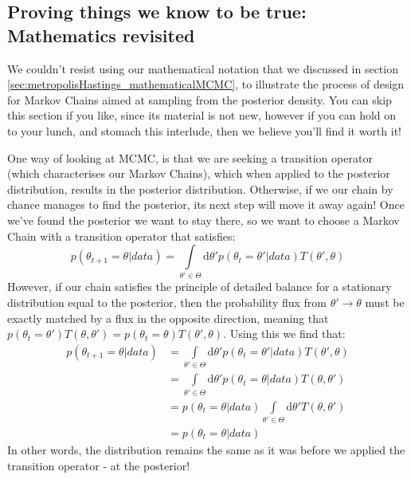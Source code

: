 \documentclass[11pt,fullpage]{book}
\begin{document}
\subsection{Proving things we know to be true: Mathematics revisited}
We couldn't resist using our mathematical notation that we discussed in section \ref{sec:metropolisHastings_mathematicalMCMC}, to illustrate the process of design for Markov Chains aimed at sampling from the posterior density. You can skip this section if you like, since its material is not new, however if you can hold on to your lunch, and stomach this interlude, then we believe you'll find it worth it!

One way of looking at MCMC, is that we are seeking a transition operator (which characterises our Markov Chains), which when applied to the posterior distribution, results in the posterior distribution\cite{chib1995understanding}. Otherwise, if we our chain by chance manages to find the posterior, its next step will move it away again! Once we've found the posterior we want to stay there, so we want to choose a Markov Chain with a transition operator that satisfies:
%
\begin{equation}
p(\theta_{t+1}=\theta|data)= \int\limits_{\theta'\in\Theta} \mathrm{d}\theta' p(\theta_t=\theta'|data) T(\theta',\theta)
\end{equation} 
%
However, if our chain satisfies the principle of detailed balance for a stationary distribution equal to the posterior, then the probability flux from $\theta'\rightarrow\theta$ must be exactly matched by a flux in the opposite direction, meaning that $p(\theta_t=\theta') T(\theta,\theta') = p(\theta_t=\theta) T(\theta',\theta)$. Using this we find that:
%
\begin{equation}
\begin{align}
p(\theta_{t+1}=\theta|data) &= \int\limits_{\theta'\in\Theta} \mathrm{d}\theta' p(\theta_t=\theta'|data) T(\theta',\theta)\\
&=\int\limits_{\theta'\in\Theta} \mathrm{d}\theta' p(\theta_t=\theta|data) T(\theta,\theta')\\
&=p(\theta_t=\theta|data) \int\limits_{\theta'\in\Theta} \mathrm{d}\theta' T(\theta,\theta')\\
&= p(\theta_t=\theta|data)
\end{align}
\end{equation}
%
In other words, the distribution remains the same as it was before we applied the transition operator - at the posterior!
\end{document}
